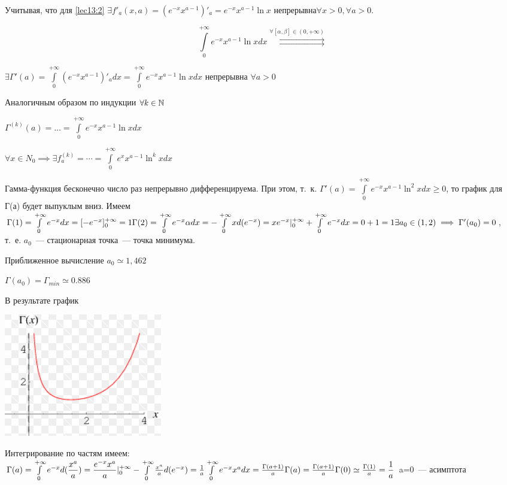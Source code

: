 \documentclass[../../main.tex]{subfiles}
\begin{document}
Учитывая, что для \eqref{lec13:2}
$
\exists f'_a(x, a) = (e^{-x} x^{a-1})'_a = e^{-x}x^{a-1} \ln x$ 
непрерывна$\forall x>0,\forall a >0.
$

\[
\int\limits_0^{+\infty} e^{-x} x^{a-1} \ln x dx
\overset{\forall \left[ \alpha, \beta \right] \in (0, 
	+\infty)}{\rightrightarrows}
\]

$
\exists \Gamma'(a) = \int\limits_0^{+\infty} (e^{-x} x^{a-1})'_a dx = 
\int\limits_0^{+\infty} e^{-x} x^{a-1} \ln x dx 
$
непрерывна
$\forall a > 0$

Аналогичным образом по индукции $\forall k \in \mathbb{N}$

$
\Gamma^{(k)}(a) = \ldots = \int\limits_0^{+\infty} e^{-x} x^{a-1} \ln x dx 
$

$
\forall x \in N_0 \implies \exists f^{(k)}_a = \cdots = 
\int\limits_0^{+\infty} e^x x^{a-1} \ln^k x dx 
$

Гамма-функция бесконечно число раз непрерывно дифференцируема.
При этом, т.~к. $\Gamma'(a) = \int\limits_0^{+\infty} e^{-x} x^{a-1} \ln^2 x 
dx \ge 
0$,
то график для Г(а) будет выпуклым вниз. Имеем
$
\Gamma(1) = \int\limits_0^{+\infty} e^{-x} dx = [-e^{-x}]^{+\infty}_0 = 1
\\
\Gamma(2) = \int\limits_0^{+\infty} e^{-x} \alpha dx = 
- \int\limits_0^{+\infty} x d(e^{-x}) = 
xe^{-x}|^{+\infty}_0 + \int\limits_0^{+\infty} e^{-x} dx = 
0 + 1 = 1
\\
\exists a_0 \in (1, 2) \implies \Gamma'(a_0) = 0$, т.~е. $a_0$~--- 
стационарная 
точка~--- точка минимума.

Приближенное вычисление $a_0 \simeq 1,462$

$\Gamma(a_0) = \Gamma_{min} \simeq 0.886$

В результате график

\includegraphics[scale = 1]{../../img/lec13_1}


Интегрирование по частям имеем:
$
\Gamma(a) = \int\limits_0^{+\infty} e^{-x} d(\dfrac{x^a}{a}) =
 \dfrac{e^{-x}x^a}{a} |^{+\infty}_0 - \int\limits_0^{+\infty} \frac{x^a}{a} 
 d(e^{-x}) = 
 \frac{1}{a} \int\limits_0^{+\infty} e^{-x} x^a dx = \frac{\Gamma(a+1)}{a}
\\
\Gamma(a) = \frac{\Gamma(a+1)}{a}
\\
\Gamma(0) \simeq \frac{\Gamma(1)}{a} = \dfrac{1}{a}
$
a=0~--- асимптота
\end{document}
